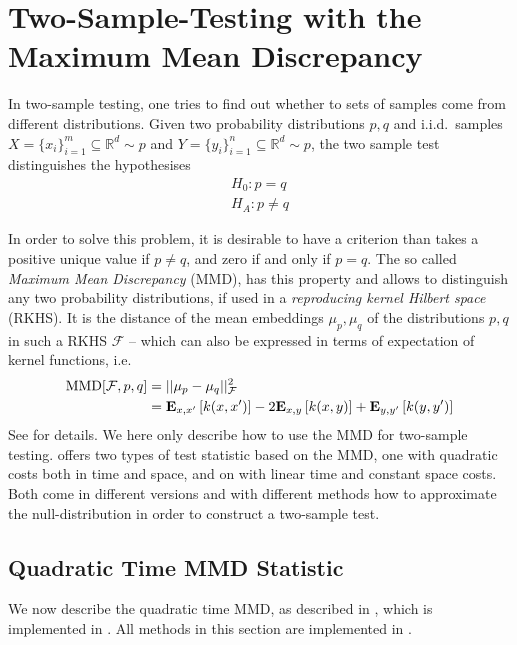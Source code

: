 %

\section{Two-Sample-Testing with the Maximum Mean Discrepancy}
\label{sec:mmd_into}
In two-sample testing, one tries to find out whether to sets of samples come from different distributions. Given two probability distributions $p,q$ and i.i.d.\ samples $X=\{x_i\}_{i=1}^m\subseteq \mathbb{R}^d\sim p$ and $Y=\{y_i\}_{i=1}^n\subseteq \mathbb{R}^d\sim p$, the two sample test distinguishes the hypothesises
\begin{align*}
H_0: p=q\\
H_A: p\neq q
\end{align*}

In order to solve this problem, it is desirable to have a criterion than takes a positive unique value if $p\neq q$, and zero if and only if $p=q$. The so called \emph{Maximum Mean Discrepancy} (MMD), has this property and allows to distinguish any two probability distributions, if used in a \emph{reproducing kernel Hilbert space} (RKHS). It is the distance of the mean embeddings $\mu_p, \mu_q$ of the distributions $p,q$ in such a RKHS $\mathcal{F}$ -- which can also be expressed in terms of expectation of kernel functions, i.e.
\begin{align}
\label{eqn:mmd_population}
\operatorname{MMD}[\mathcal{F},p,q]&=||\mu_p-\mu_q||_\mathcal{F}^2\\
&=\textbf{E}_{x,x'}\left[ k(x,x')\right]-
  2\textbf{E}_{x,y}\left[ k(x,y)\right]
  +\textbf{E}_{y,y'}\left[ k(y,y')\right]\notag
\end{align}
See \citep[Section 2]{Gretton2012} for details. We here only describe how to
use the MMD for two-sample testing. \shogun{} offers two types of test statistic based on the MMD, one with quadratic costs both in time and space, and on with linear time and constant space costs. Both come in different versions and with different methods how to approximate the null-distribution in order to construct a two-sample test.

\subsection{Quadratic Time MMD Statistic}
\label{sec:mmd_quadratic}
We now describe the quadratic time MMD, as described in \citep[Lemma
6]{Gretton2012}, which is implemented in \shogun{}. All methods in this section are implemented in .

